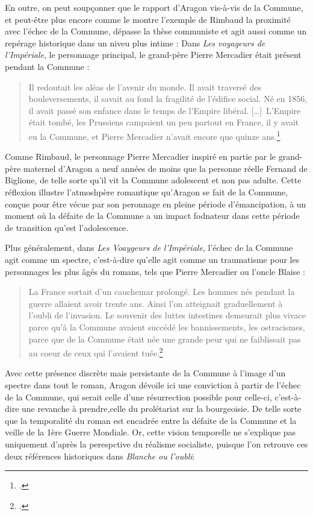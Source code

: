 En outre, on peut soupçonner que le rapport d'Aragon vis-à-vis de la Commune, et peut-être plus encore comme le montre l'exemple de Rimbaud la proximité avec l'échec de la Commune, dépasse la thèse communiste et agit aussi comme un repérage historique dans un niveu plus intime : Dans \emph{Les voyageurs de l'Impériale}, le personnage principal, le grand-père Pierre Mercadier était présent pendant la Commune : 
\begin{quote}
 Il redoutait les aléas de l’avenir du monde. Il avait traversé des bouleversements, il savait au fond la fragilité de l’édifice social. Né en 1856, il avait passé son enfance dans le temps de l’Empire libéral. […] L’Empire était tombé, les Prussiens campaient un peu partout en France, il y avait eu la Commune, et Pierre Mercadier n’avait encore que quinze ans.\footcite[p43]{voyageursdelimperiale}\end{quote}

 Comme Rimbaud, le personnage Pierre Mercadier inspiré en partie par le grand-père maternel d'Aragon a neuf années de moins que la personne réelle Fernand de Biglione, de telle sorte qu'il vit la Commune adolescent et non pas adulte. Cette réflexion illustre l'atmoshpère romantique qu'Aragon se fait de la Commune, conçue pour être vécue par son peronnage en pleine période d'émancipation, à un moment où la défaite de la Commune a un impact fodnateur dans cette période de transition qu'est l'adolescence. 

 Plus généralement, dans \emph{Les Voaygeurs de l'Impériale}, l'échec de la Commune agit comme un spectre, c'est-à-dire qu'elle agit comme un traumatisme pour les personnages les plus âgés du romans, tels que Pierre Mercadier ou l'oncle Blaise :

 \begin{quote}
 La France sortait d’un cauchemar prolongé. Les hommes nés pendant la guerre allaient avoir trente ans. Ainsi l’on atteignait graduellement à l’oubli de l’invasion. Le souvenir des luttes intestines demeurait plus vivace parce qu’à la Commune avaient succédé les bannissements, les ostracismes, parce que de la Commune était née une grande peur qui ne faiblissait pas au coeur de  ceux qui l’avaient tuée.\footcite[p459]{voyageursdelimperiale}\end{quote}

 Avec cette présence discrète mais persistante de la Commune à l'image d'un spectre dans tout le roman, Aragon dévoile ici une conviction à partir de l'échec de la Commune, qui serait celle d'une résurrection possible pour celle-ci, c'est-à-dire une revanche à prendre,celle du prolétariat sur la bourgeoisie. De telle sorte que la temporalité du roman est encadrée entre la défaite de la Commune et la veille de la 1ère Guerre Mondiale. Or, cette vision temporelle ne s'explique pas uniquement d'après la perespctive du réalisme socialiste, puisque l'on retrouve ces deux références historiques dans \emph{Blanche ou l'oubli}:

